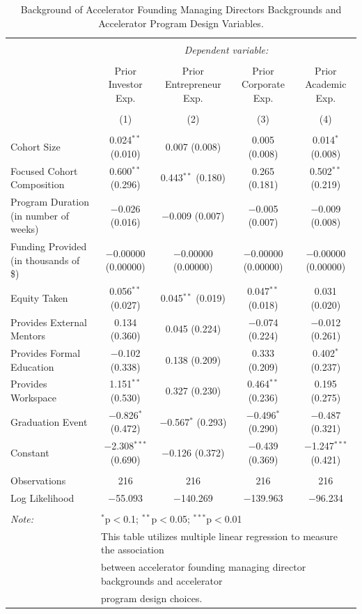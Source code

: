 \documentclass[
  12pt,
]{article}
\begin{document}
\begin{table}[H] \centering 
  \caption{Background of Accelerator Founding Managing Directors Backgrounds and Accelerator Program Design Variables.} 
  \label{tab:mdbackaccdesign} 
\scriptsize 
\begin{tabular}{@{\extracolsep{1pt}}lcccc} 
\\[-1.8ex]\hline 
\hline \\[-1.8ex] 
 & \multicolumn{4}{c}{\textit{Dependent variable:}} \\ 
\cline{2-5} 
\\[-1.8ex] & Prior Investor Exp. & Prior Entrepreneur Exp. & Prior Corporate Exp. & Prior Academic Exp. \\ 
\\[-1.8ex] & (1) & (2) & (3) & (4)\\ 
\hline \\[-1.8ex] 
 Cohort Size & 0.024$^{**}$ (0.010) & 0.007 (0.008) & 0.005 (0.008) & 0.014$^{*}$ (0.008) \\ 
  Focused Cohort Composition & 0.600$^{**}$ (0.296) & 0.443$^{**}$ (0.180) & 0.265 (0.181) & 0.502$^{**}$ (0.219) \\ 
  Program Duration (in number of weeks) & $-$0.026 (0.016) & $-$0.009 (0.007) & $-$0.005 (0.007) & $-$0.009 (0.008) \\ 
  Funding Provided (in thousands of \$) & $-$0.00000 (0.00000) & $-$0.00000 (0.00000) & $-$0.00000 (0.00000) & $-$0.00000 (0.00000) \\ 
  Equity Taken & 0.056$^{**}$ (0.027) & 0.045$^{**}$ (0.019) & 0.047$^{**}$ (0.018) & 0.031 (0.020) \\ 
  Provides External Mentors & 0.134 (0.360) & 0.045 (0.224) & $-$0.074 (0.224) & $-$0.012 (0.261) \\ 
  Provides Formal Education & $-$0.102 (0.338) & 0.138 (0.209) & 0.333 (0.209) & 0.402$^{*}$ (0.237) \\ 
  Provides Workspace & 1.151$^{**}$ (0.530) & 0.327 (0.230) & 0.464$^{**}$ (0.236) & 0.195 (0.275) \\ 
  Graduation Event & $-$0.826$^{*}$ (0.472) & $-$0.567$^{*}$ (0.293) & $-$0.496$^{*}$ (0.290) & $-$0.487 (0.321) \\ 
  Constant & $-$2.308$^{***}$ (0.690) & $-$0.126 (0.372) & $-$0.439 (0.369) & $-$1.247$^{***}$ (0.421) \\ 
 \hline \\[-1.8ex] 
Observations & 216 & 216 & 216 & 216 \\ 
Log Likelihood & $-$55.093 & $-$140.269 & $-$139.963 & $-$96.234 \\ 
\hline 
\hline \\[-1.8ex] 
\textit{Note:}  & \multicolumn{4}{l}{$^{*}$p$<$0.1; $^{**}$p$<$0.05; $^{***}$p$<$0.01} \\ 
 & \multicolumn{4}{l}{This table utilizes multiple linear regression to measure the association } \\ 
 & \multicolumn{4}{l}{between accelerator founding managing director backgrounds and accelerator } \\ 
 & \multicolumn{4}{l}{program design choices.} \\ 
\end{tabular} 
\end{table}
\end{document}
